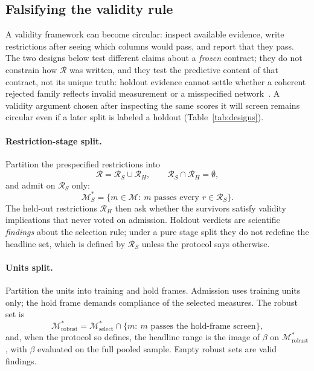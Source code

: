 \documentclass[10pt,letterpaper]{article}
\newcommand{\M}{\ensuremath{\mathcal{M}}}
\newcommand{\Rset}{\mathcal{R}}
\begin{document}
\subsection{Falsifying the validity rule}
\label{sec:falsify}

A validity framework can become circular: inspect available evidence, write restrictions after seeing which columns would pass, and report that they pass.
The two designs below test different claims about a \emph{frozen} contract; they do not constrain how $\Rset$ was written, and they test the predictive content of that contract, not its unique truth: holdout evidence cannot settle whether a coherent rejected family reflects invalid measurement or a misspecified network~\cite{flake2020}.
A validity argument chosen after inspecting the same scores it will screen remains circular even if a later split is labeled a holdout (Table~\ref{tab:designs}).

\paragraph{Restriction-stage split.}
Partition the prespecified restrictions into
\begin{equation}
\Rset=\Rset_S\cup\Rset_H,\qquad \Rset_S\cap\Rset_H=\emptyset,
\label{eq:partition}
\end{equation}
and admit on $\Rset_S$ only:
\begin{equation}
\M^*_S=\bigl\{m\in\M:\ m\text{ passes every }r\in\Rset_S\bigr\}.
\label{eq:Mselect}
\end{equation}
The held-out restrictions $\Rset_H$ then ask whether the survivors satisfy validity implications that never voted on admission.
Holdout verdicts are scientific \emph{findings} about the selection rule; under a pure stage split they do not redefine the headline set, which is defined by $\Rset_S$ unless the protocol says otherwise.

\paragraph{Units split.}
Partition the units into training and hold frames.
Admission uses training units only; the hold frame demands compliance of the selected measures.
The robust set is
\begin{equation}
\M^*_{\mathrm{robust}}=\M^*_{\mathrm{select}}\cap\bigl\{m:\ \text{$m$ passes the hold-frame screen}\bigr\},
\label{eq:Mrobust}
\end{equation}
and, when the protocol so defines, the headline range is the image of $\beta$ on $\M^*_{\mathrm{robust}}$, with $\beta$ evaluated on the full pooled sample.
Empty robust sets are valid findings.
\end{document}
